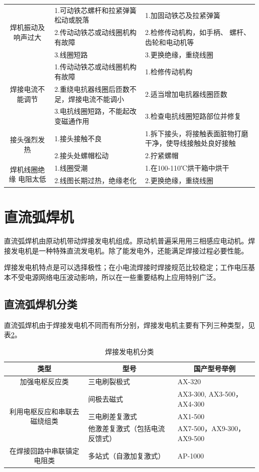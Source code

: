 \documentclass{ctexbook}
\begin{document}
\begin{table}[htbp]
\begin{tabular}{c|l|l}
		\midrule
		\multirow{3}[6]{*}{焊机振动及响声过大} & 1.可动铁芯螺杆和拉紧弹簧松动或脱落 & 1.加固动铁芯及拉紧弹簧   \\
		\cmidrule{2-3}          & 2.传动动铁芯或动线圈机构有故障 & 2.检修传动机构，如手柄、 螺杆、齿轮和电动机等 \\
		\cmidrule{2-3}          & 3.线圈短路 & 3.更换绝缘，重绕线圈 \\
		\midrule
		\multirow{3}[6]{*}{焊接电流不能调节} & 1.传动动铁芯或动线圈机构有故障 & 1.检修传动机构   \\
		\cmidrule{2-3}          & 2.重绕电抗器线圈后匝数不足，焊接电流不能调小 & 2.适当增加电抗器线圈匝数 \\
		\cmidrule{2-3}          & 3.电抗线圈短路，不能起改变磁通作用 & 3.检查电抗线圈短路部位并修复 \\
		\midrule
		\multirow{2}[4]{*}{接头强烈发热} & 1.接头接触不良 & 1.拆下接头，将接触表面脏物打磨干净，使导线接触处良好接触  \\
		\cmidrule{2-3}          & 2.接头处螺帽松动 & 2.拧紧螺帽 \\
		\midrule
		\multirow{2}[4]{*}{焊机线圈绝缘 电阻太低} & 1.线圈受潮  & 1.在100-110℃烘干箱中烘干 \\
		\cmidrule{2-3}          & 2.线图长期过热，绝缘老化 & 2.更换绝缘，重绕线圈 \\
		\bottomrule
	\end{tabular}%
	\label{tab:hanjibianyaqichangjianguzhang}%
\end{table}%
\section{直流弧焊机}
直流弧焊机由原动机带动焊接发电机组成。原动机普遍采用用三相感应电动机。焊接发电机是一种特殊直流发电机。除了能发电外，还能满足焊接过程必要性能。

焊接发电机特点是可以选择极性；在小电流焊接时焊接规范比较稳定；工作电压基本不受电源网络电压波动影响，所以在一些重要结构上应用特别广泛。
\subsection{直流弧焊机分类}
直流弧焊机由于焊接发电机不同而有所分别，焊接发电机主要有下列三种类型，见表\ref{tab:hanjiefadianjifenlei}。
\begin{table}[htbp]
	\centering
	\caption{焊接发电机分类}
	\begin{tabular}{c|l|l}
		\hline
		类型    & \multicolumn{1}{c}{型号} & \multicolumn{1}{c}{国产型号举例} \\ \hline
		加强电枢反应类 & 三电刷裂极式 & AX-320 \\ \hline
		\multirow{3}[0]{*}{利用电枢反应和串联去磁绕组类} & 间极去磁式 & AX3-300, AX3-500，AX4-300 \\ \hline
		& 三电刷差复激式 & AX1-500 \\ \hline
		& 他激差复激式（包括电流 反馈式） & AX7-500，AX9-300，AX9-500 \\ \hline
		在焊接回路中串联镇定电阻类 & 多站式（自激加复激式） & AP-1000 \\ \hline
	\end{tabular}%
	\label{tab:hanjiefadianjifenlei}%
\end{table}%
\end{document}
